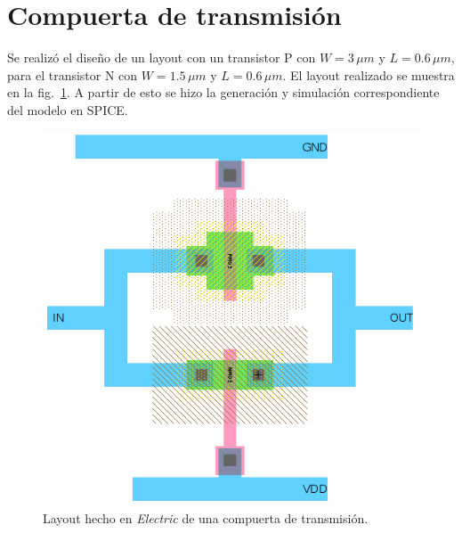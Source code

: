 \documentclass[twocolumn]{IEEEtran}
\begin{document}
\section{Compuerta de transmisión}
\noindent
Se realizó el diseño de un layout con un transistor P con $W=3\, \mu m$ y $L=0.6 \,\mu m$, para el transistor N con $W=1.5\, \mu m$ y $L=0.6 \,\mu m$. El layout realizado se muestra en la fig.~\ref{fig3}. A partir de esto se hizo la generación y simulación correspondiente del modelo en SPICE.
\begin{figure}[H]
  \centering
    \includegraphics[scale=0.35]{pics/trans.png}
      \caption{Layout hecho en \textit{Electric} de una compuerta de transmisión.}
	\label{fig3}
\end{figure}
\end{document}
